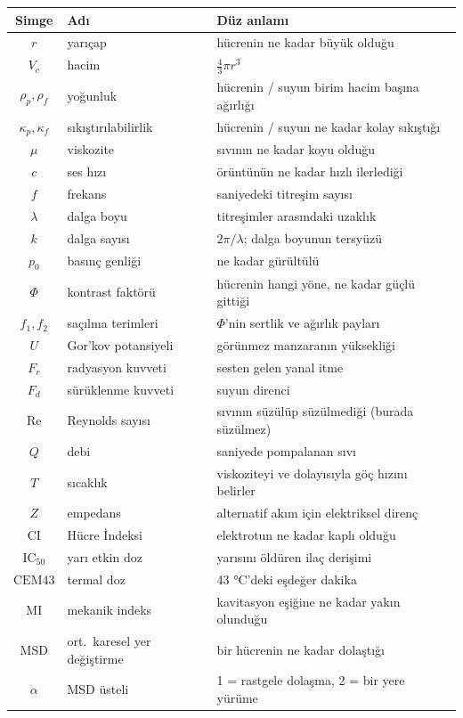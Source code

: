 \documentclass[11pt,a4paper]{article}
\begin{document}
\begin{center}\small
\begin{tabular}{cll}
\toprule
\textbf{Simge} & \textbf{Adı} & \textbf{Düz anlamı} \\
\midrule
$r$ & yarıçap & hücrenin ne kadar büyük olduğu \\
$V_c$ & hacim & $\tfrac43\pi r^3$ \\
$\rho_p,\rho_f$ & yoğunluk & hücrenin / suyun birim hacim başına ağırlığı \\
$\kappa_p,\kappa_f$ & sıkıştırılabilirlik & hücrenin / suyun ne kadar kolay sıkıştığı \\
$\mu$ & viskozite & sıvının ne kadar koyu olduğu \\
$c$ & ses hızı & örüntünün ne kadar hızlı ilerlediği \\
$f$ & frekans & saniyedeki titreşim sayısı \\
$\lambda$ & dalga boyu & titreşimler arasındaki uzaklık \\
$k$ & dalga sayısı & $2\pi/\lambda$; dalga boyunun tersyüzü \\
$p_0$ & basınç genliği & ne kadar gürültülü \\
$\Phi$ & kontrast faktörü & hücrenin hangi yöne, ne kadar güçlü gittiği \\
$f_1,f_2$ & saçılma terimleri & $\Phi$'nin sertlik ve ağırlık payları \\
$U$ & Gor'kov potansiyeli & görünmez manzaranın yüksekliği \\
$F_r$ & radyasyon kuvveti & sesten gelen yanal itme \\
$F_d$ & sürüklenme kuvveti & suyun direnci \\
$\mathrm{Re}$ & Reynolds sayısı & sıvının süzülüp süzülmediği (burada süzülmez) \\
$Q$ & debi & saniyede pompalanan sıvı \\
$T$ & sıcaklık & viskoziteyi ve dolayısıyla göç hızını belirler \\
$Z$ & empedans & alternatif akım için elektriksel direnç \\
$\mathrm{CI}$ & Hücre İndeksi & elektrotun ne kadar kaplı olduğu \\
$\mathrm{IC}_{50}$ & yarı etkin doz & yarısını öldüren ilaç derişimi \\
$\mathrm{CEM43}$ & termal doz & 43 °C'deki eşdeğer dakika \\
$\mathrm{MI}$ & mekanik indeks & kavitasyon eşiğine ne kadar yakın olunduğu \\
$\mathrm{MSD}$ & ort.\ karesel yer değiştirme & bir hücrenin ne kadar dolaştığı \\
$\alpha$ & MSD üsteli & 1 = rastgele dolaşma, 2 = bir yere yürüme \\
\bottomrule
\end{tabular}
\end{center}
\end{document}
